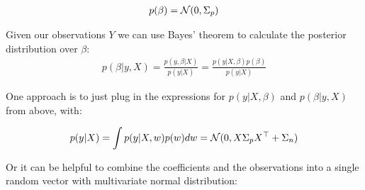 \begin{gather*}
    p(\beta) = \operatorname{\mathcal{N}}(0, \Sigma_p)
\end{gather*}

Given our observations $Y$  we can use Bayes' theorem to calculate the posterior distribution over $\beta$:
\begin{gather*}
    p(\beta|y, X) = \frac{p(y,\beta|X)}{p(y|X)} = \frac{p(y|X,\beta)p(\beta)}{p(y|X)}
\end{gather*}

One approach is to just plug in the expressions for $p(y|X,\beta)$ and $p(\beta|y, X)$ from above, with:

\begin{gather*}
    p(y|X) = \int p(y|X,w) p(w) dw = \operatorname{\mathcal{N}}(0, X \Sigma_p X^{\top} + \Sigma_n)
\end{gather*}

Or it can be helpful to combine the coefficients and the observations into a single random vector with
multivariate normal distribution:

